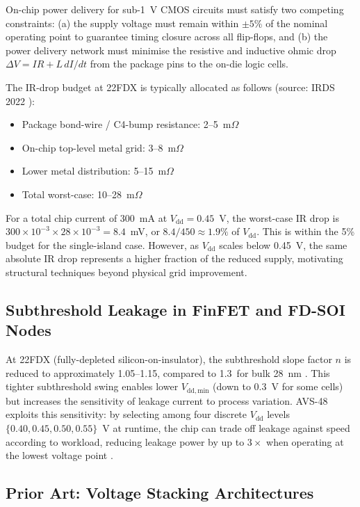 On-chip power delivery for sub-1~V CMOS circuits must satisfy two
competing constraints: (a) the supply voltage must remain within
$\pm 5$\% of the nominal operating point to guarantee timing closure
across all flip-flops, and (b) the power delivery network must minimise
the resistive and inductive ohmic drop $\Delta V = I R + L \,dI/dt$
from the package pins to the on-die logic cells.

The IR-drop budget at 22FDX is typically allocated as follows
(source: IRDS 2022 \cite{irds2023}):
\begin{itemize}
  \item Package bond-wire / C4-bump resistance: 2--5~m$\Omega$
  \item On-chip top-level metal grid: 3--8~m$\Omega$
  \item Lower metal distribution: 5--15~m$\Omega$
  \item Total worst-case: 10--28~m$\Omega$
\end{itemize}

For a total chip current of 300~mA at $V_\mathrm{dd} = 0.45$~V, the
worst-case IR drop is $300 \times 10^{-3} \times 28 \times 10^{-3} = 8.4$~mV,
or $8.4/450 \approx 1.9\%$ of $V_\mathrm{dd}$.  This is within the 5\%
budget for the single-island case.  However, as $V_\mathrm{dd}$ scales
below 0.45~V, the same absolute IR drop represents a higher fraction of
the reduced supply, motivating structural techniques beyond physical grid
improvement.

\subsection{Subthreshold Leakage in FinFET and FD-SOI Nodes}

At 22FDX (fully-depleted silicon-on-insulator), the subthreshold slope
factor $n$ is reduced to approximately 1.05--1.15, compared to 1.3~for
bulk 28~nm \cite{irds2023}.  This tighter subthreshold swing enables
lower $V_\mathrm{dd,min}$ (down to 0.3~V for some cells) but increases
the sensitivity of leakage current to process variation.  AVS-48
exploits this sensitivity: by selecting among four discrete
$V_\mathrm{dd}$ levels $\{0.40, 0.45, 0.50, 0.55\}$~V at runtime,
the chip can trade off leakage against speed according to workload,
reducing leakage power by up to $3\times$ when operating at the lowest
voltage point \cite{dreslinski_near_threshold_2010}.

\subsection{Prior Art: Voltage Stacking Architectures}

